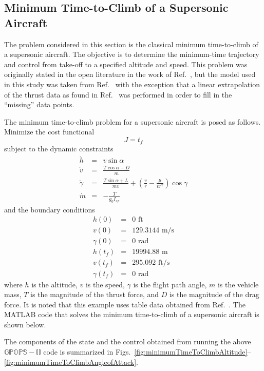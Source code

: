 \documentclass[10pt]{article}
\newenvironment{shadedframe}{%
  \def\FrameCommand{\fcolorbox{black}{shadecolor}}%
  \MakeFramed {\FrameRestore}}
{\endMakeFramed}
\begin{document}
\clearpage

\subsection{Minimum Time-to-Climb of a Supersonic Aircraft}

The problem considered in this section is the classical minimum
time-to-climb of a supersonic aircraft.  The objective is to determine
the minimum-time trajectory and control from take-off to a specified
altitude and speed.  This problem was originally stated in the open
literature in the work of Ref.~, but the model used in
this study was taken from Ref.~ with the exception that
a linear extrapolation of the thrust data as found in
Ref.~ was performed in order to fill in the ``missing'' 
data points.

The minimum time-to-climb problem for a supersonic aircraft is posed
as follows.  Minimize the cost functional
\begin{equation}
  J = t_f
\end{equation}
subject to the dynamic constraints
\begin{eqnarray}
  \dot{h} & = & v\sin\alpha \\
  \dot{v} & = & \frac{T\cos\alpha-D}{m} \\
 \dot{\gamma} & = & \frac{T\sin\alpha+L}{mv}+\left(\frac{v}{r}-\frac{\mu}{vr^2}\right)\cos\gamma\\
 \dot{m} & =&  -\frac{T}{g_0 I_{sp}} 
\end{eqnarray}
and the boundary conditions
\begin{eqnarray}
  h(0) & = & 0 \textrm{ ft} \\
  v(0) & = & 129.3144 \textrm{ m/s} \\
  \gamma(0) & = & 0 \textrm{ rad} \\
  h(t_f) & = & 19994.88 \textrm{ m} \\
  v(t_f) & = & 295.092 \textrm{ ft/s} \\
  \gamma(t_f) & = & 0 \textrm{ rad}
\end{eqnarray}
where $h$ is the altitude, $v$ is the speed, $\gamma$ is the
flight path angle, $m$ is the vehicle mass, $T$ is the magnitude of
the thrust force, and $D$ is the magnitude of the drag force.  It is
noted that this example uses table data obtained from
Ref.~.  The MATLAB code that solves the minimum
time-to-climb of a supersonic aircraft is shown below.
\begin{shadedframe}




\end{shadedframe} 
The components of the state and the control obtained from running the
above $\mathbb{GPOPS-II}$ code is summarized in Figs.~\ref{fig:minimumTimeToClimbAltitude}--\ref{fig:minimumTimeToClimbAngleofAttack}.
\end{document}
